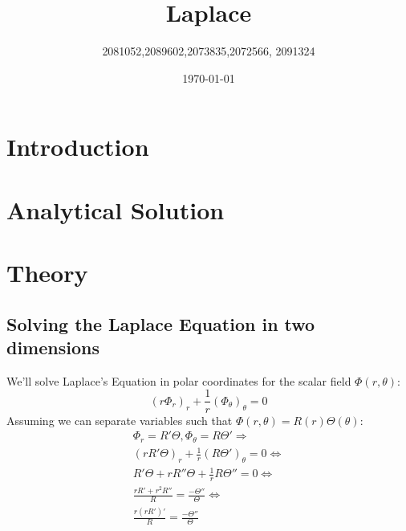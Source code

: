 \documentclass{article}
\begin{document}
	\title{Laplace}
	\author{2081052,2089602,2073835,2072566, 2091324}
	\date{\today}
	\maketitle
	
	\begin{abstract}
	\end{abstract}
	\section{Introduction}
	\section{Analytical Solution}
	
	\section{Theory \label{sec:the}}

\subsection{Solving the Laplace Equation in two dimensions}
We'll solve Laplace's Equation in polar coordinates for the scalar field $\Phi(r, \theta)$:
\[ \left( r \Phi_r \right)_r + \frac{1}{r} \left(\Phi_\theta \right)_\theta = 0 \]
Assuming we can separate variables such that $\Phi(r, \theta) = R(r)\Theta(\theta)$:
\begin{gather*}
 \Phi_r = R'\Theta, \Phi_\theta = R\Theta' \Rightarrow \\
 (rR'\Theta)_r + \frac{1}{r}(R\Theta')_\theta = 0 \Leftrightarrow \\
 R'\Theta + rR''\Theta + \frac{1}{r}R\Theta'' = 0 \Leftrightarrow \\
 \frac{rR' + r^2 R''}{R} = \frac{- \Theta''}{\Theta} \Leftrightarrow \\
 \frac{r(rR')'}{R} = \frac{- \Theta''}{\Theta}
\end{gather*}
\end{document}
